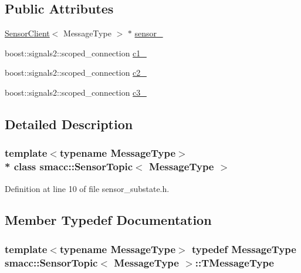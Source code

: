 \subsection*{Public Attributes}
\begin{DoxyCompactItemize}
\item 
\hyperlink{classsmacc_1_1SensorClient}{Sensor\+Client}$<$ Message\+Type $>$ $\ast$ \hyperlink{classsmacc_1_1SensorTopic_a0f51a83e96f6b735033a8474ef1c4191}{sensor\+\_\+}
\item 
boost\+::signals2\+::scoped\+\_\+connection \hyperlink{classsmacc_1_1SensorTopic_a3c27b66b1bd8bc850875d95ad5a41041}{c1\+\_\+}
\item 
boost\+::signals2\+::scoped\+\_\+connection \hyperlink{classsmacc_1_1SensorTopic_a7d93fd46086bf098cf75a12c27976a8e}{c2\+\_\+}
\item 
boost\+::signals2\+::scoped\+\_\+connection \hyperlink{classsmacc_1_1SensorTopic_a2e54533c2a0e0daec10eec3f69ff63d6}{c3\+\_\+}
\end{DoxyCompactItemize}


\subsection{Detailed Description}
\subsubsection*{template$<$typename Message\+Type$>$\\*
class smacc\+::\+Sensor\+Topic$<$ Message\+Type $>$}



Definition at line 10 of file sensor\+\_\+substate.\+h.



\subsection{Member Typedef Documentation}
\subsubsection[{\texorpdfstring{T\+Message\+Type}{TMessageType}}]{\setlength{\rightskip}{0pt plus 5cm}template$<$typename Message\+Type$>$ typedef Message\+Type {\bf smacc\+::\+Sensor\+Topic}$<$ Message\+Type $>$\+::{\bf T\+Message\+Type}}\hypertarget{classsmacc_1_1SensorTopic_a5ba13cdfe30513184afe37aeaa5bbe88}{}\label{classsmacc_1_1SensorTopic_a5ba13cdfe30513184afe37aeaa5bbe88}



